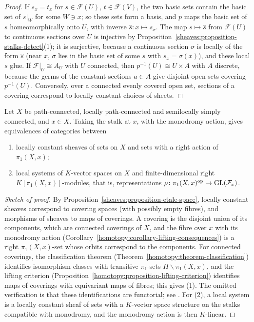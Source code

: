 \begin{proof}
If $s_x = t_x$ for $s \in \mathcal{F}(U)$, $t \in \mathcal{F}(V)$, the two basic sets contain the basic set of $s|_W$ for some $W \ni x$; so these sets form a basis, and $p$ maps the basic
set of $s$ homeomorphically onto $U$, with inverse $\hat{s} \colon x \mapsto s_x$. The map $s \mapsto \hat{s}$ from $\mathcal{F}(U)$ to continuous sections over $U$ is injective by
Proposition~\ref{sheaves:proposition-stalks-detect}(1); it is surjective, because a continuous section $\sigma$ is locally of the form $\hat{s}$ (near $x$, $\sigma$ lies in the basic
set of some $s$ with $s_x = \sigma(x)$), and these local $s$ glue. If $\mathcal{F}|_U \cong A_U$ with $U$ connected, then $p^{-1}(U) \cong U \times A$ with $A$ discrete, because the germs of
the constant sections $a \in A$ give disjoint open sets covering $p^{-1}(U)$. Conversely, over a connected evenly covered open set, sections of a covering correspond to locally constant
choices of sheets.
\end{proof}

\begin{theorem}\label{sheaves:theorem-local-systems-representations}
Let $X$ be path-connected, locally path-connected and semilocally simply connected, and $x \in X$. Taking the stalk at $x$, with the monodromy action, gives equivalences of
categories between
\begin{enumerate}
\item locally constant sheaves of sets on $X$ and sets with a right action of $\pi_1(X, x)$;
\item local systems of $K$-vector spaces on $X$ and finite-dimensional right $K[\pi_1(X, x)]$-modules, that is, representations
$\rho \colon \pi_1(X, x)^{\mathrm{op}} \to \mathrm{GL}(\mathcal{F}_x)$.
\end{enumerate}
\end{theorem}

\begin{proof}[Sketch of proof]
By Proposition~\ref{sheaves:proposition-etale-space}, locally constant sheaves correspond to covering spaces (with possibly empty fibres), and morphisms of sheaves to maps of
coverings. A covering is the disjoint union of its components, which are connected coverings of $X$, and the fibre over $x$ with its monodromy action
(Corollary~\ref{homotopy:corollary-lifting-consequences}) is a right $\pi_1(X, x)$-set whose orbits correspond to the components. For connected coverings, the classification
theorem (Theorem~\ref{homotopy:theorem-classification}) identifies isomorphism classes with transitive $\pi_1$-sets $H\backslash\pi_1(X, x)$, and the lifting criterion
(Proposition~\ref{homotopy:proposition-lifting-criterion}) identifies maps of coverings with equivariant maps of fibres; this gives (1). The omitted verification is that these
identifications are functorial; see \cite[Chapter 2]{szamuely-galois}. For (2), a local system is a locally constant sheaf of sets with a $K$-vector space structure on the stalks
compatible with monodromy, and the monodromy action is then $K$-linear.
\end{proof}

